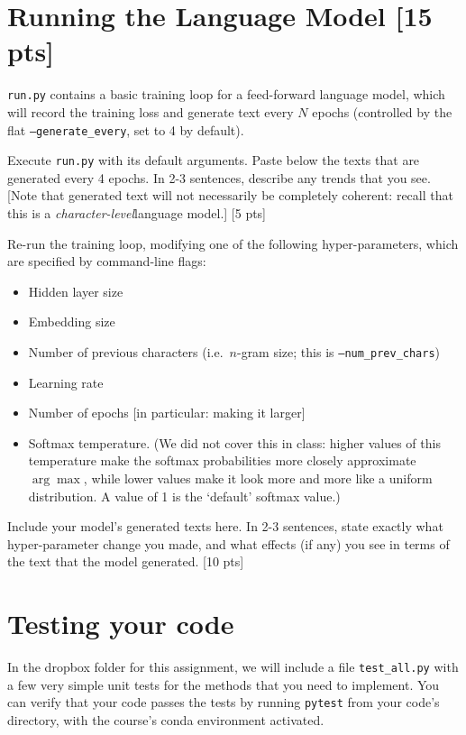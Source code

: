 \documentclass[11pt]{article}
\begin{document}
\section{Running the Language Model [15 pts]}

\texttt{run.py} contains a basic training loop for a feed-forward language model, which will record the training loss and generate text every $N$ epochs (controlled by the flat \texttt{--generate\_every}, set to 4 by default).

\vspace{2em}
  Execute \texttt{run.py} with its default arguments.  Paste below the texts that are generated every 4 epochs.  In 2-3 sentences, describe any trends that you see.  [Note that generated text will not necessarily be completely coherent: recall that this is a \emph{character-level}language model.] \hfill [5 pts]

\vspace{2em}
 Re-run the training loop, modifying one of the following hyper-parameters, which are specified by command-line flags:
\begin{itemize}
  \item Hidden layer size
  \item Embedding size
  \item Number of previous characters (i.e.\ $n$-gram size; this is \texttt{--num\_prev\_chars})
  \item Learning rate
  \item Number of epochs [in particular: making it larger]
  \item Softmax temperature.  (We did not cover this in class: higher values of this temperature make the softmax probabilities more closely approximate $\arg\max$, while lower values make it look more and more like a uniform distribution.  A value of 1 is the `default' softmax value.)
\end{itemize}
Include your model's generated texts here.  In 2-3 sentences, state exactly what hyper-parameter change you made, and what effects (if any) you see in terms of the text that the model generated. \hfill [10 pts]

\section{Testing your code}

In the dropbox folder for this assignment, we will include a file \texttt{test\_all.py} with a few very simple unit tests for the methods that you need to implement.  You can verify that your code passes the tests by running \texttt{pytest} from your code's directory, with the course's conda environment activated.
\end{document}

